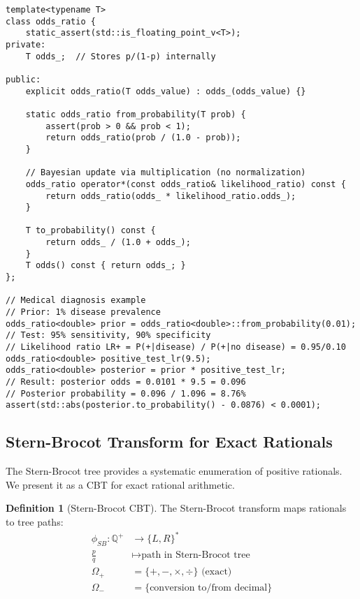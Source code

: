 \documentclass[11pt]{article}
\theoremstyle{definition}
\newtheorem{definition}{Definition}
\begin{document}
\begin{lstlisting}[caption={Bayesian inference via odds-ratio}]
template<typename T>
class odds_ratio {
    static_assert(std::is_floating_point_v<T>);
private:
    T odds_;  // Stores p/(1-p) internally
    
public:
    explicit odds_ratio(T odds_value) : odds_(odds_value) {}
    
    static odds_ratio from_probability(T prob) {
        assert(prob > 0 && prob < 1);
        return odds_ratio(prob / (1.0 - prob));
    }
    
    // Bayesian update via multiplication (no normalization)
    odds_ratio operator*(const odds_ratio& likelihood_ratio) const {
        return odds_ratio(odds_ * likelihood_ratio.odds_);
    }
    
    T to_probability() const { 
        return odds_ / (1.0 + odds_); 
    }
    T odds() const { return odds_; }
};

// Medical diagnosis example
// Prior: 1% disease prevalence  
odds_ratio<double> prior = odds_ratio<double>::from_probability(0.01);
// Test: 95% sensitivity, 90% specificity
// Likelihood ratio LR+ = P(+|disease) / P(+|no disease) = 0.95/0.10
odds_ratio<double> positive_test_lr(9.5);  
odds_ratio<double> posterior = prior * positive_test_lr;
// Result: posterior odds = 0.0101 * 9.5 = 0.096
// Posterior probability = 0.096 / 1.096 = 8.76%
assert(std::abs(posterior.to_probability() - 0.0876) < 0.0001);
\end{lstlisting}

\subsection{Stern-Brocot Transform for Exact Rationals}

The Stern-Brocot tree \cite{stern1858ueber, brocot1861calcul} provides a systematic enumeration of positive rationals. We present it as a CBT for exact rational arithmetic.

\begin{definition}[Stern-Brocot CBT]
The Stern-Brocot transform maps rationals to tree paths:
\begin{align}
\phi_{SB}: \mathbb{Q}^+ &\to \{L, R\}^* \\
\frac{p}{q} &\mapsto \text{path in Stern-Brocot tree} \\
\Omega_+ &= \{+, -, \times, \div\} \text{ (exact)} \\
\Omega_- &= \{\text{conversion to/from decimal}\}
\end{align}
\end{definition}
\end{document}
